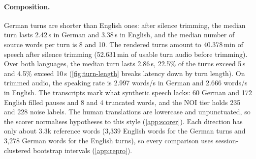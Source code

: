 \paragraph{Composition.}
German turns are shorter than English ones: after silence trimming, the median turn lasts 2.42\,s in German and 3.38\,s in English, and the median number of source words per turn is 8 and 10. The rendered turns amount to 40.378\,min of speech after silence trimming (52.631\,min of usable turn audio before trimming). Over both languages, the median turn lasts 2.86\,s, 22.5\% of the turns exceed 5\,s and 4.5\% exceed 10\,s (\cref{fig:turn-length} breaks latency down by turn length). On trimmed audio, the speaking rate is 2.997 words/s in German and 2.666 words/s in English. The transcripts mark what synthetic speech lacks: 60 German and 172 English filled pauses and 8 and 4 truncated words, and the NOI tier holds 235 and 228 noise labels. The human translations are lowercase and unpunctuated, so the scorer normalises hypotheses to this style (\cref{app:scorer}). Each direction has only about 3.3k reference words (3,339 English words for the German turns and 3,278 German words for the English turns), so every comparison uses session-clustered bootstrap intervals (\cref{app:repro}).

